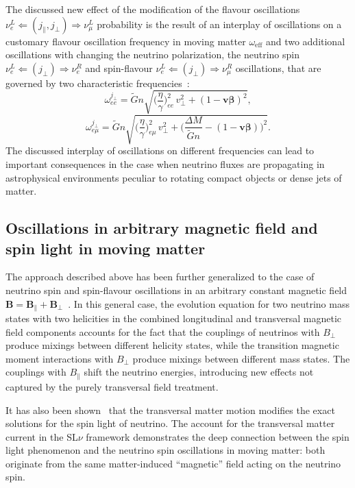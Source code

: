 \documentclass[a4paper,11pt]{article}
\begin{document}
The discussed new effect of the modification of the flavour oscillations $\nu_e^L \Leftarrow (j_\parallel, j_\perp) \Rightarrow \nu_\mu^L$ probability is the result of an interplay of oscillations on a customary flavour oscillation frequency in moving matter $\omega_{\text{eff}}$ and two additional oscillations with changing the neutrino polarization, the neutrino spin $\nu_e^L \Leftarrow (j_\perp) \Rightarrow \nu_e^R$ and spin-flavour $\nu_e^L \Leftarrow (j_\perp) \Rightarrow \nu_\mu^R$ oscillations, that are governed by two characteristic frequencies~\cite{Studenikin:2019arXiv}:
\begin{equation}
\label{eq:omega_ee}
\omega_{ee}^{j_\perp} = \tilde{G}n\sqrt{\Big(\frac{\eta}{\gamma}\Big)_{ee}^2\,v_\perp^2 + (1-\mathbf{v}\boldsymbol{\beta})^2},
\end{equation}
\begin{equation}
\label{eq:omega_emu}
\omega_{e\mu}^{j_\perp} = \tilde{G}n\sqrt{\Big(\frac{\eta}{\gamma}\Big)_{e\mu}^2\,v_\perp^2 + \Big(\frac{\Delta M}{\tilde{G}n} - (1-\mathbf{v}\boldsymbol{\beta})\Big)^2}.
\end{equation}
The discussed interplay of oscillations on different frequencies can lead to important consequences in the case when neutrino fluxes are propagating in astrophysical environments peculiar to rotating compact objects or dense jets of matter.

\subsection{Oscillations in arbitrary magnetic field and spin light in moving matter}

The approach described above has been further generalized to the case of neutrino spin and spin-flavour oscillations in an arbitrary constant magnetic field $\mathbf{B} = \mathbf{B}_\parallel + \mathbf{B}_\perp$~\cite{Studenikin:2016EPJ,Fabbricatore:2016}. In this general case, the evolution equation for two neutrino mass states with two helicities in the combined longitudinal and transversal magnetic field components accounts for the fact that the couplings of neutrinos with $B_\perp$ produce mixings between different helicity states, while the transition magnetic moment interactions with $B_\perp$ produce mixings between different mass states. The couplings with $B_\parallel$ shift the neutrino energies, introducing new effects not captured by the purely transversal field treatment.

It has also been shown~\cite{Grigoriev:2024RuPhJ} that the transversal matter motion modifies the exact solutions for the spin light of neutrino. The account for the transversal matter current in the SL$\nu$ framework demonstrates the deep connection between the spin light phenomenon and the neutrino spin oscillations in moving matter: both originate from the same matter-induced ``magnetic'' field acting on the neutrino spin.
\end{document}
